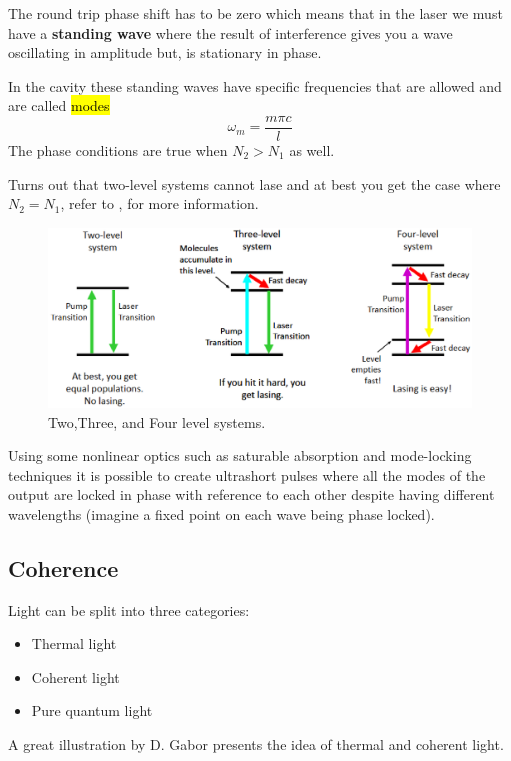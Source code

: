 \documentclass{article}
\begin{document}
The round trip phase shift has to be zero which means that in the laser we must have a \textbf{standing wave} where the result of interference gives you a wave oscillating in amplitude but, is stationary in phase.

In the cavity these standing waves have specific frequencies that are allowed and are called \hl{modes}
\begin{equation}
	\omega_m = \frac{m\pi c}{l}
\end{equation}
The phase conditions are true when $N_2 > N_1$ as well.

Turns out that two-level systems cannot lase and at best you get the case where $N_2 = N_1$, refer to \cite{foxqmoptics},\cite{li} for more information.
\begin{figure}[!phbt]
    \centering
    \includegraphics[width=0.75\linewidth]{img/levelsystems.eps}
    \caption{Two,Three, and Four level systems.}
    \label{fig:levelsystems}
\end{figure}

Using some nonlinear optics such as saturable absorption and mode-locking techniques it is possible to create ultrashort pulses where all the modes of the output are locked in phase with reference to each other despite having different wavelengths (imagine a fixed point on each wave being phase locked).

\subsection{Coherence}
Light can be split into three categories:
\begin{itemize}
    \item Thermal light
    \item Coherent light
    \item Pure quantum light
\end{itemize}

A great illustration by D. Gabor presents the idea of thermal and coherent light.
\end{document}
